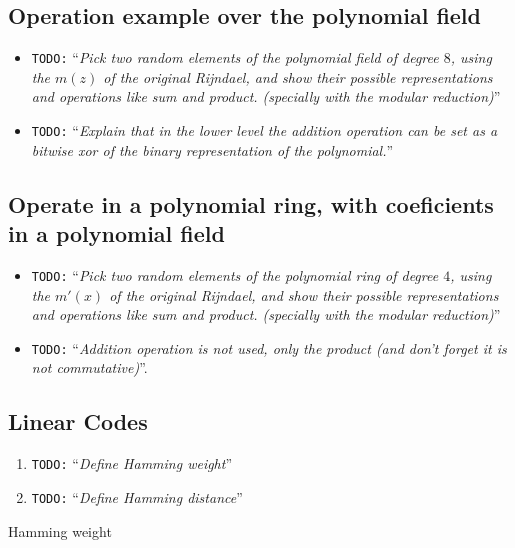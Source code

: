 \documentclass[10pt,a4paper,twoside]{llncs}
\newcommand{\todo}[1]{\texttt{\color{red}TODO:} ``\emph{#1}''}
\begin{document}
\subsection{Operation example over the polynomial field}\label{sec:polynomialField}

\begin{itemize}
 \item \todo{Pick two random elements of the polynomial field of degree $8$, using the $m(z)$ of the original \emph{Rijndael}, and show their possible representations and operations like sum and product. (specially with the modular reduction)}
 \item \todo{Explain that in the lower level the addition operation can be set as a bitwise \emph{xor} of the binary representation of the polynomial.}
\end{itemize}

\subsection{Operate in a polynomial ring, with coeficients in a polynomial field}\label{sec:polynomialRing}
\begin{itemize}
\item \todo{Pick two random elements of the polynomial ring of degree $4$, using the $m'(x)$ of the original \emph{Rijndael}, and show their possible representations and operations like sum and product. (specially with the modular reduction)}
 \item \todo{Addition operation is not used, only the product (and don't forget it is not commutative)}.
\end{itemize}

\subsection{Linear Codes}\label{sec:LinearCodes}

\begin{enumerate}
 \item \todo{Define Hamming weight}
 \item \todo{Define Hamming distance}
\end{enumerate}

\begin{definition}\label{def:hammingWeight}
 Hamming weight
\end{definition}
\end{document}
